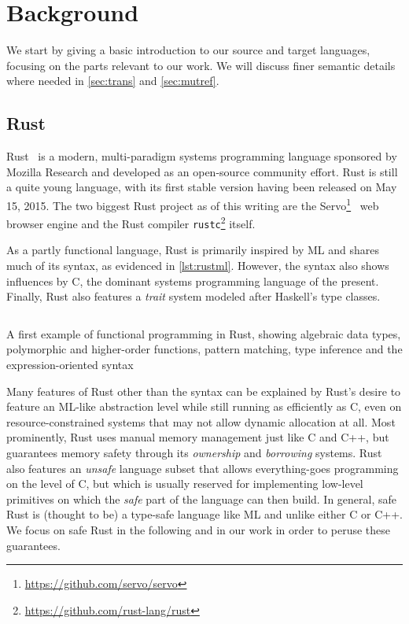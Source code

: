 \section{Background}
We start by giving a basic introduction to our source and target
languages, focusing on the parts relevant to our work. We will discuss finer
semantic details where needed in \autoref{sec:trans} and \autoref{sec:mutref}.

\subsection{Rust}
\label{sec:rust}

Rust~\cite{matsakis2014rust} is a modern, multi-paradigm systems programming language sponsored
by Mozilla Research and developed as an open-source community effort. Rust is still a quite young language, with its first stable
version having been released on May 15, 2015. The two biggest Rust project as of
this writing are the Servo\footnote{\url{https://github.com/servo/servo}}~\cite{anderson2016engineering} web browser engine and
the Rust compiler \texttt{rustc}\footnote{\url{https://github.com/rust-lang/rust}} itself.

As a partly functional language, Rust is primarily inspired by ML and shares much of
its syntax, as evidenced in \autoref{lst:rustml}. However, the syntax also shows
influences by C, the dominant systems programming language of the present.
Finally, Rust also features a \emph{trait} system modeled after Haskell's type classes.

\begin{listing}[!bp]
  \inputminted{rust}{code/rustml.rs}
  
  \caption{A first example of functional programming in Rust, showing algebraic
    data types, polymorphic and higher-order functions, pattern matching, type
    inference and the expression-oriented syntax}
  \label{lst:rustml}
\end{listing}

Many features of Rust other than the syntax can be explained by Rust's desire to
feature an ML-like abstraction level while still running as efficiently as C,
even on resource-constrained systems that may not allow dynamic allocation at all.
Most prominently, Rust uses manual memory management just like C and C++, but
guarantees memory safety through its \emph{ownership} and
\emph{borrowing} systems. Rust also features an \emph{unsafe} language subset that allows
everything-goes programming on the level of C, but which is usually reserved for
implementing low-level primitives on which the \emph{safe} part of the language can
then build. In general, safe Rust is (thought to be) a type-safe
language like ML and unlike either C or C++. We focus on safe Rust in the
following and in our work in order to peruse these guarantees.

